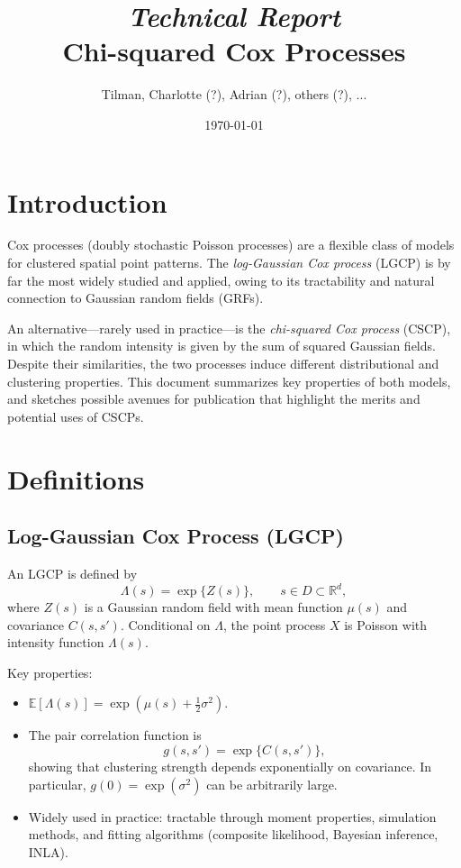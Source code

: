 \documentclass[11pt]{article}
\title{\textit{\textbf{Technical Report}}\\Chi-squared Cox Processes}
\author{Tilman, Charlotte (?), Adrian (?), others (?), ...}
\date{\today}
\begin{document}
	\maketitle
	
	\section{Introduction}
	Cox processes (doubly stochastic Poisson processes) are a flexible class of models for clustered spatial point patterns. The \emph{log-Gaussian Cox process} (LGCP) is by far the most widely studied and applied, owing to its tractability and natural connection to Gaussian random fields (GRFs). 
	
	An alternative---rarely used in practice---is the \emph{chi-squared Cox process} (CSCP), in which the random intensity is given by the sum of squared Gaussian fields. Despite their similarities, the two processes induce different distributional and clustering properties. This document summarizes key properties of both models, and sketches possible avenues for publication that highlight the merits and potential uses of CSCPs.
	
	\section{Definitions}
	
	\subsection{Log-Gaussian Cox Process (LGCP)}
	An LGCP is defined by
	\[
	\Lambda(s) = \exp\{ Z(s) \}, \qquad s \in D \subset \mathbb{R}^d,
	\]
	where $Z(s)$ is a Gaussian random field with mean function $\mu(s)$ and covariance $C(s,s')$. Conditional on $\Lambda$, the point process $X$ is Poisson with intensity function $\Lambda(s)$.
	
	Key properties:
	\begin{itemize}
		\item $\mathbb{E}[\Lambda(s)] = \exp(\mu(s) + \tfrac{1}{2}\sigma^2)$.
		\item The pair correlation function is
		\[
		g(s,s') = \exp\{ C(s,s') \},
		\]
		showing that clustering strength depends exponentially on covariance. In particular, $g(0)=\exp(\sigma^2)$ can be arbitrarily large.
		\item Widely used in practice: tractable through moment properties, simulation methods, and fitting algorithms (composite likelihood, Bayesian inference, INLA).
	\end{itemize}
	
\end{document}
